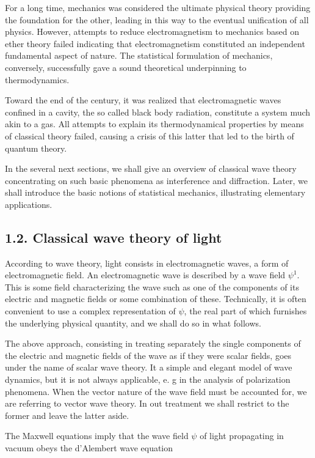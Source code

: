 \documentclass{article}
\begin{document}
For a long time, mechanics was considered the ultimate physical theory providing the foundation for the other, leading in this way to the eventual unification of all physics. However, attempts to reduce electromagnetism to mechanics based on ether theory failed indicating that electromagnetism constituted an independent fundamental aspect of nature. The statistical formulation of mechanics, conversely, successfully gave a sound theoretical underpinning to thermodynamics.

Toward the end of the century, it was realized that electromagnetic waves confined in a cavity, the so called black body radiation, constitute a system much akin to a gas. All attempts to explain its thermodynamical properties by means of classical theory failed, causing a crisis of this latter that led to the birth of quantum theory.

In the several next sections, we shall give an overview of classical wave theory concentrating on such basic phenomena as interference and diffraction. Later, we shall introduce the basic notions of statistical mechanics, illustrating elementary applications.

\subsection*{1.2. Classical wave theory of light}

According to wave theory, light consists in electromagnetic waves, a form of electromagnetic field. An electromagnetic wave is described by a wave field $\psi^{1}$. This is some field characterizing the wave such as one of the components of its electric and magnetic fields or some combination of these. Technically, it is often convenient to use a complex representation of $\psi$, the real part of which furnishes the underlying physical quantity, and we shall do so in what follows.

The above approach, consisting in treating separately the single components of the electric and magnetic fields of the wave as if they were scalar fields, goes under the name of scalar wave theory. It a simple and elegant model of wave dynamics, but it is not always applicable, e. g in the analysis of polarization phenomena. When the vector nature of the wave field must be accounted for, we are referring to vector wave theory. In out treatment we shall restrict to the former and leave the latter aside.

The Maxwell equations imply that the wave field $\psi$ of light propagating in vacuum obeys the d'Alembert wave equation
 
\end{document}
